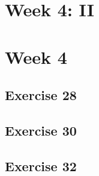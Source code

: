 \documentclass[a4paper]{article}
\let\stdsection\section
\renewcommand\section{\newpage\stdsection}
\begin{document}
\section*{Week 4: II}






\newpage
\section*{Week 4}
\subsection*{Exercise 28}








\newpage
\subsection*{Exercise 30}


\newpage
\subsection*{Exercise 32}





\newpage
\end{document}
